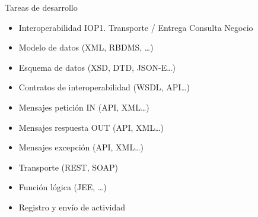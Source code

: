 \documentclass[
  paper=a4,
  ,captions=tableheading
]{scrartcl}
\providecommand{\tightlist}{%
  \setlength{\itemsep}{0pt}\setlength{\parskip}{0pt}}
\begin{document}
Tareas de desarrollo

\begin{itemize}
\tightlist
\item
  Interoperabilidad IOP1. Transporte / Entrega Consulta Negocio
\item
  Modelo de datos (XML, RBDMS, \ldots)
\item
  Esquema de datos (XSD, DTD, JSON-E\ldots)
\item
  Contratos de interoperabilidad (WSDL, API\ldots)
\item
  Mensajes petición IN (API, XML\ldots)
\item
  Mensajes respuesta OUT (API, XML\ldots)
\item
  Mensajes excepción (API, XML\ldots)
\item
  Transporte (REST, SOAP)
\item
  Función lógica (JEE, \ldots)
\item
  Registro y envío de actividad
\end{itemize}
\end{document}
